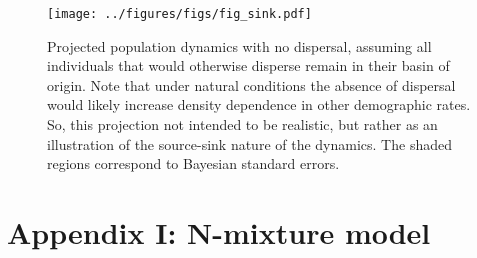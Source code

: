 \documentclass[11pt]{article}
\begin{document}
{%
\clearpage
\begin{figure}
\centering
\texttt{[image: ../figures/figs/fig\_sink.pdf]}
\caption{\label{fig:sink}
Projected population dynamics with no dispersal,
assuming all individuals that would otherwise disperse remain 
in their basin of origin.
Note that under natural conditions the absence of dispersal 
would likely increase density dependence in other demographic rates.
So, this projection not intended to be realistic, 
but rather as an illustration of the source-sink nature of the dynamics.
The shaded regions correspond to Bayesian standard errors.
}
\end{figure}
\clearpage

\renewcommand{\thefigure}{A\arabic{figure}}
\renewcommand{\theequation}{A\arabic{equation}}
\renewcommand{\thetable}{A\arabic{table}}
\setcounter{equation}{0}
\setcounter{figure}{0}
\setcounter{table}{0}

\section*{Appendix I: N-mixture model} 

}
\end{document}
